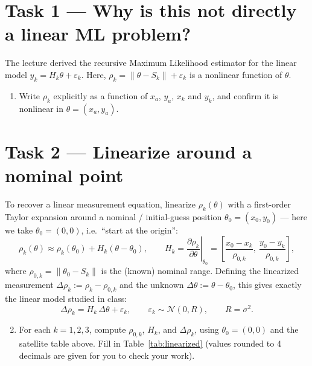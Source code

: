 \documentclass[11pt]{article}
\begin{document}
\section{Task 1 --- Why is this not directly a linear ML problem?}

The lecture derived the recursive Maximum Likelihood estimator for the linear model
$y_k = H_k\theta + \varepsilon_k$. Here, $\rho_k = \|\theta - S_k\| + \varepsilon_k$ is a nonlinear
function of $\theta$.

\begin{enumerate}[leftmargin=2.2em]
\item Write $\rho_k$ explicitly as a function of $x_a$, $y_a$, $x_k$ and $y_k$, and confirm it is
      nonlinear in $\theta = (x_a,y_a)$.
\end{enumerate}

\section{Task 2 --- Linearize around a nominal point}

To recover a linear measurement equation, linearize $\rho_k(\theta)$ with a first-order Taylor expansion
around a nominal / initial-guess position $\theta_0 = (x_0,y_0)$ --- here we take $\theta_0 = (0,0)$,
i.e.\ ``start at the origin'':
\begin{equation}
  \rho_k(\theta) \approx \rho_k(\theta_0) + H_k(\theta - \theta_0), \qquad
  H_k = \left.\frac{\partial \rho_k}{\partial \theta}\right|_{\theta_0}
      = \left[\frac{x_0-x_k}{\rho_{0,k}},\ \frac{y_0-y_k}{\rho_{0,k}}\right],
\end{equation}
where $\rho_{0,k} = \|\theta_0 - S_k\|$ is the (known) nominal range. Defining the linearized measurement
$\Delta\rho_k := \rho_k - \rho_{0,k}$ and the unknown $\Delta\theta := \theta - \theta_0$, this gives
exactly the linear model studied in class:
\begin{equation}
  \Delta\rho_k = H_k\,\Delta\theta + \varepsilon_k, \qquad \varepsilon_k \sim \mathcal{N}(0,R), \qquad R = \sigma^2.
\end{equation}

\begin{enumerate}[leftmargin=2.2em]
\setcounter{enumi}{1}
\item For each $k=1,2,3$, compute $\rho_{0,k}$, $H_k$, and $\Delta\rho_k$, using $\theta_0=(0,0)$ and the
      satellite table above. Fill in Table~\ref{tab:linearized} (values rounded to 4 decimals are given
      for you to check your work).
\end{enumerate}
\end{document}
